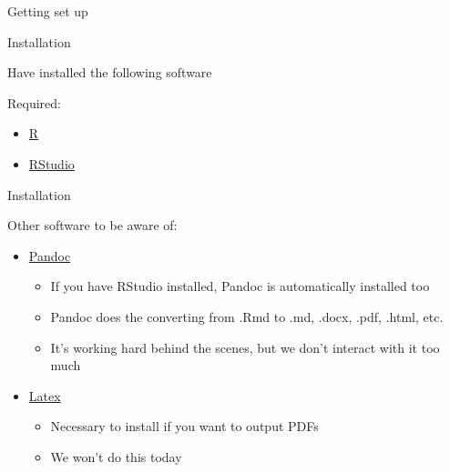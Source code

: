 \documentclass[
  ignorenonframetext,
]{beamer}
\providecommand{\tightlist}{%
  \setlength{\itemsep}{0pt}\setlength{\parskip}{0pt}}
\begin{document}
\begin{frame}{Getting set up}
\protect\hypertarget{getting-set-up}{}

\begin{block}{Installation}

\begin{block}{Have installed the following software}

Required:

\begin{itemize}
\tightlist
\item
  \href{https://cran.r-project.org/}{R}
\item
  \href{rstudio.com}{RStudio}
\end{itemize}

\end{block}

\end{block}

\begin{block}{Installation}

Other software to be aware of:

\begin{itemize}
\tightlist
\item
  \href{https://pandoc.org/installing.html}{Pandoc}

  \begin{itemize}
  \tightlist
  \item
    If you have RStudio installed, Pandoc is automatically installed too
  \item
    Pandoc does the converting from .Rmd to .md, .docx, .pdf, .html,
    etc.
  \item
    It's working hard behind the scenes, but we don't interact with it
    too much
  \end{itemize}
\item
  \href{https://www.latex-project.org/get/}{Latex}

  \begin{itemize}
  \tightlist
  \item
    Necessary to install if you want to output PDFs
  \item
    We won't do this today
  \end{itemize}
\end{itemize}

\end{block}

\end{frame}
\end{document}

